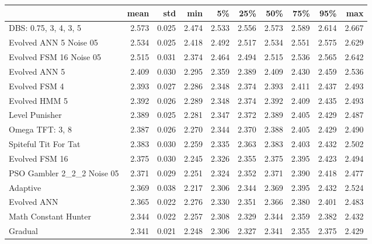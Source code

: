 \begin{tabular}{lrrrrrrrrr}
\toprule
{} &   mean &    std &    min &     5\% &    25\% &    50\% &    75\% &    95\% &    max \\
\midrule
DBS: 0.75, 3, 4, 3, 5      &  2.573 &  0.025 &  2.474 &  2.533 &  2.556 &  2.573 &  2.589 &  2.614 &  2.667 \\
Evolved ANN 5 Noise 05     &  2.534 &  0.025 &  2.418 &  2.492 &  2.517 &  2.534 &  2.551 &  2.575 &  2.629 \\
Evolved FSM 16 Noise 05    &  2.515 &  0.031 &  2.374 &  2.464 &  2.494 &  2.515 &  2.536 &  2.565 &  2.642 \\
Evolved ANN 5              &  2.409 &  0.030 &  2.295 &  2.359 &  2.389 &  2.409 &  2.430 &  2.459 &  2.536 \\
Evolved FSM 4              &  2.393 &  0.027 &  2.286 &  2.348 &  2.374 &  2.393 &  2.411 &  2.437 &  2.493 \\
Evolved HMM 5              &  2.392 &  0.026 &  2.289 &  2.348 &  2.374 &  2.392 &  2.409 &  2.435 &  2.493 \\
Level Punisher             &  2.389 &  0.025 &  2.281 &  2.347 &  2.372 &  2.389 &  2.405 &  2.429 &  2.487 \\
Omega TFT: 3, 8            &  2.387 &  0.026 &  2.270 &  2.344 &  2.370 &  2.388 &  2.405 &  2.429 &  2.490 \\
Spiteful Tit For Tat       &  2.383 &  0.030 &  2.259 &  2.335 &  2.363 &  2.383 &  2.403 &  2.432 &  2.502 \\
Evolved FSM 16             &  2.375 &  0.030 &  2.245 &  2.326 &  2.355 &  2.375 &  2.395 &  2.423 &  2.494 \\
PSO Gambler 2\_2\_2 Noise 05 &  2.371 &  0.029 &  2.251 &  2.324 &  2.352 &  2.371 &  2.390 &  2.418 &  2.477 \\
Adaptive                   &  2.369 &  0.038 &  2.217 &  2.306 &  2.344 &  2.369 &  2.395 &  2.432 &  2.524 \\
Evolved ANN                &  2.365 &  0.022 &  2.276 &  2.330 &  2.351 &  2.366 &  2.380 &  2.401 &  2.483 \\
Math Constant Hunter       &  2.344 &  0.022 &  2.257 &  2.308 &  2.329 &  2.344 &  2.359 &  2.382 &  2.432 \\
Gradual                    &  2.341 &  0.021 &  2.248 &  2.306 &  2.327 &  2.341 &  2.355 &  2.375 &  2.429 \\
\bottomrule
\end{tabular}
